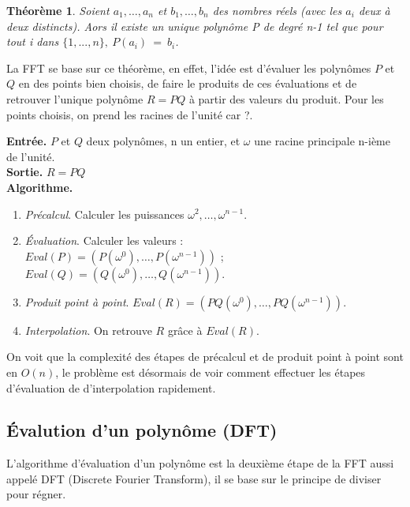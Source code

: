 \documentclass[12pt, a4paper]{article}
\begin{document}
\newtheorem{Thm1}{Théorème}
\begin{Thm1}
Soient $a_1,\dots,a_n$ et $b_1,\dots,b_n$ des nombres réels (avec les $a_i$ deux à deux distincts). Aors il existe un unique polynôme P de degré n-1 tel que pour tout i dans $\{1,..., n\},\ P(a_i)\ =\ b_i$.
\end{Thm1}

La FFT se base sur ce théorème, en effet, l’idée est d’évaluer les polynômes $P$ et $Q$ en des points bien choisis, de faire le produits de ces évaluations et de retrouver l’unique polynôme $R=PQ$ à partir des valeurs du produit. Pour les points choisis, on prend les racines de l’unité car ?.
 
\begin{tcolorbox}[colback=cyan!5!white,
                  colframe=cyan!100!black,
                  title=\textbf{Algorithme FFT (METTRE SOURCES)}
                 ]
\textbf{Entrée.} $P$ et $Q$ deux polynômes, n un entier, et $\omega$ une racine principale n-ième de l’unité. \\
\textbf{Sortie.} $R = PQ$ \\
\textbf{Algorithme.}
\begin{enumerate}[itemsep=-2ex]
\item\textit{Précalcul}. Calculer les puissances $\omega^2,\dots,\omega^{n-1}$. \\
\item\textit{Évaluation}. Calculer les valeurs : \\ $Eval(P)=(P(\omega^0),\dots,P(\omega^{n-1}))$ ; $Eval(Q)=(Q(\omega^0),\dots,Q(\omega^{n-1}))$. \\
\item\textit{Produit point à point}. $Eval(R) = (PQ(\omega^0),\dots,PQ(\omega^{n-1}))$. \\
\item\textit{Interpolation}. On retrouve $R$ grâce à $Eval(R)$.
\end{enumerate}
\end{tcolorbox}
On voit que la complexité des étapes de précalcul et de produit point à point sont en $O(n)$, le problème est désormais de voir comment effectuer les étapes d'évaluation de d'interpolation rapidement.

\subsection{Évalution d'un polynôme (DFT)}

L'algorithme d'évaluation d'un polynôme est la deuxième étape de la FFT aussi appelé DFT (Discrete Fourier Transform), il se base sur le principe de diviser pour régner. 
\end{document}
